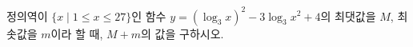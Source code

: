정의역이 $\{x \mid 1\le x\le 27\}$인 함수 $y=(\log_3 x)^2-3\log_3 x^2+4$의 최댓값을 $M$, 최솟값을 $m$이라 할 때, $M+m$의 값을 구하시오.
